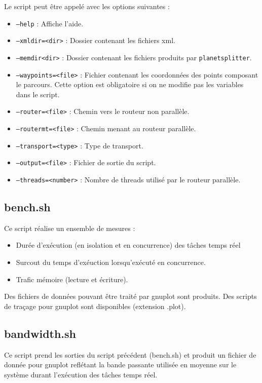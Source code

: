 \begin{appendices}
  Le script peut être appelé avec les options suivantes : \\
  \begin{itemize}
    \renewcommand{\labelitemi}{$\bullet$}
  \item \texttt{--help} : Affiche l'aide.
  \item \texttt{--xmldir=<dir>} : Dossier contenant les fichiers xml.
  \item \texttt{--memdir<dir>} : Dossier contenant les fichiers produits
    par \texttt{planetsplitter}.
  \item \texttt{--waypoints=<file>} : Fichier contenant les coordonnées des 
    points composant le parcours. Cette option est obligatoire si on ne 
    modifie pas les variables dans le script.
  \item \texttt{--router=<file>} : Chemin vers le routeur non parallèle.
  \item \texttt{--routermt=<file>} : Chemin menant au routeur parallèle.
  \item \texttt{--transport=<type>} : Type de transport.
  \item \texttt{--output=<file>} : Fichier de sortie du script.
  \item \texttt{--threads=<number>} : Nombre de threads utilisé par le routeur
    parallèle.
  \end{itemize}

  \subsection{bench.sh}

  Ce script réalise un ensemble de mesures : 
  \begin{itemize}
    \renewcommand{\labelitemi}{$\bullet$}
  \item Durée d'exécution (en isolation et en concurrence) des tâches temps réel
  \item Surcout du temps d'exéuction lorsqu'exécuté en concurrence.
  \item Trafic mémoire (lecture et écriture).
  \end{itemize}

  Des fichiers de données pouvant être traité par gnuplot sont produits. Des
  scripts de traçage pour gnuplot sont disponibles (extension .plot). 

  \subsection{bandwidth.sh}

  Ce script prend les sorties du script précédent (bench.sh) et produit un 
  fichier de donnée pour gnuplot reflétant la bande passante utilisée en 
  moyenne sur le système durant l'exécution des tâches temps réel. 

\end{appendices}
